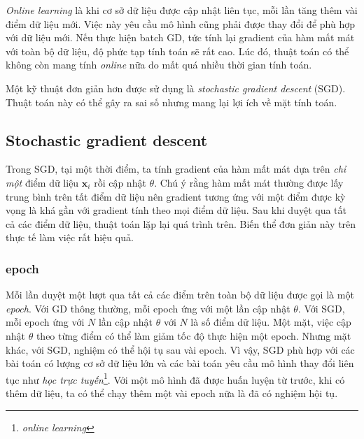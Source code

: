  
\textit{Online learning} là khi cơ sở dữ liệu được cập nhật liên tục, mỗi lần
tăng thêm vài điểm dữ liệu mới. Việc này yêu cầu mô
hình cũng phải được thay đổi để phù hợp với dữ liệu mới. Nếu thực hiện
batch GD, tức tính lại gradient của hàm mất mát với toàn bộ dữ liệu, độ
phức tạp tính toán sẽ rất cao. Lúc đó, thuật toán có thể không còn mang tính
\textit{online} nữa do mất quá nhiều thời gian tính toán.

Một kỹ thuật đơn giản hơn được sử dụng là \textit{stochastic gradient descent}
(SGD). Thuật toán này có thể gây ra sai số nhưng mang lại lợi ích về mặt tính
toán.


\subsection{Stochastic gradient descent}
Trong SGD, tại một thời điểm, ta tính gradient của hàm
mất mát dựa trên \textit{chỉ một} điểm dữ liệu $\mathbf{x}_i$ rồi cập nhật
$\theta$. Chú ý rằng hàm mất mát thường được lấy trung bình
trên tất điểm dữ liệu nên gradient tương ứng với một điểm {được kỳ vọng} là khá
gần với gradient tính theo mọi điểm dữ liệu. Sau khi duyệt qua tất cả
các điểm dữ liệu, thuật toán lặp lại quá trình trên. Biến thể đơn giản này trên
thực tế làm việc rất hiệu quả.


\subsubsection{epoch}
Mỗi lần duyệt một lượt qua {tất cả} các điểm trên toàn bộ dữ liệu được gọi là
một \textit{epoch}. Với GD thông thường, mỗi epoch ứng với một lần cập nhật
$\theta$. Với SGD, mỗi epoch ứng với $N$ lần cập nhật $\theta$ với $N$ là số
điểm dữ liệu. Một mặt, việc cập nhật $\theta$ theo từng điểm có thể làm giảm tốc
độ thực hiện một epoch. Nhưng mặt khác, với SGD, nghiệm có thể hội tụ sau vài
epoch. Vì vậy, SGD phù hợp với các bài toán có lượng cơ sở dữ liệu lớn và các
bài toán yêu cầu mô hình thay đổi liên tục như \textit{học trực
tuyến}\footnote{\textit{online learning}}. Với một mô hình đã được huấn luyện từ
trước, khi có thêm dữ liệu, ta có thể chạy thêm một vài epoch nữa là đã có
nghiệm hội tụ.

